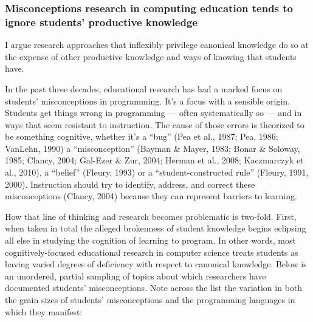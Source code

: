 \subsubsection{Misconceptions research in computing education tends to
ignore students' productive
knowledge}\label{misconceptions-research-in-computing-education-tends-to-ignore-students-productive-knowledge}

I argue research
approaches that inflexibly privilege canonical knowledge do so at the
expense of other productive knowledge and ways of knowing that students
have.

In the past three decades, educational research has had a marked focus
on students' misconceptions in programming. It's a focus with a sensible
origin. Students get things wrong in programming --- often
systematically so --- and in ways that seem resistant to instruction.
The cause of those errors is theorized to be something cognitive,
whether it's a ``bug'' \cite{pea_buggy_1987} (Pea et al., 1987; Pea, 1986; VanLehn, 1990) a
``misconception'' (Bayman \& Mayer, 1983; Bonar \& Soloway, 1985;
Clancy, 2004; Gal-Ezer \& Zur, 2004; Herman et al., 2008; Kaczmarczyk et
al., 2010), a ``belief'' (Fleury, 1993) or a ``student-constructed
rule'' (Fleury, 1991, 2000). Instruction should try to identify,
address, and correct these misconceptions (Clancy, 2004) because they
can represent barriers to learning.

How that line of thinking and research becomes problematic is two-fold.
First, when taken in total the alleged brokenness of student knowledge
begins eclipsing all else in studying the cognition of learning to
program. In other words, most cognitively-focused educational research
in computer science treats students as having varied degrees of
deficiency with respect to canonical knowledge. Below is an unordered,
partial sampling of topics about which researchers have documented
students' misconceptions. Note across the list the variation in both the
grain sizes of students' misconceptions and the programming languages in
which they manifest:

